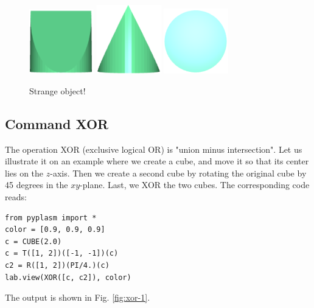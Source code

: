 \documentclass{article}
\begin{document}
\begin{figure}[!ht]
\begin{center}
\includegraphics[width=0.25\textwidth]{img/int-1a.png}
\includegraphics[width=0.25\textwidth]{img/int-1b.png}
\includegraphics[width=0.25\textwidth]{img/int-1c.png}
\end{center}
\vspace{-2mm}
\caption{Strange object!}
\label{fig:int-1}
\end{figure}


\subsection{Command XOR}

The operation XOR (exclusive logical OR) is "union minus intersection". Let us illustrate it 
on an example where we create a cube, and move it so that its center lies on the $z$-axis. Then 
we create a second cube by rotating the original cube by 45 degrees in the $xy$-plane. Last,
we XOR the two cubes. The corresponding code reads:
 
\begin{verbatim}
from pyplasm import *
color = [0.9, 0.9, 0.9]
c = CUBE(2.0)
c = T([1, 2])([-1, -1])(c)
c2 = R([1, 2])(PI/4.)(c)
lab.view(XOR([c, c2]), color) 
\end{verbatim}
The output is shown in Fig. \ref{fig:xor-1}.
\end{document}
